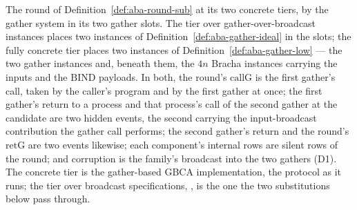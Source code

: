 \begin{definition}
  \label{def:aba-gbca-gather-low}
  \leanok
  The round of Definition~\ref{def:aba-round-sub} at its two concrete tiers, by the gather system in its two gather slots.
  The tier over gather-over-broadcast instances places two instances of Definition~\ref{def:aba-gather-ideal} in the slots; the fully concrete tier places two instances of Definition~\ref{def:aba-gather-low} --- the two gather instances and, beneath them, the $4n$ Bracha instances carrying the inputs and the $\mathrm{BIND}$ payloads.
  In both, the round's $\mathrm{callG}$ is the first gather's call, taken by the caller's program and by the first gather at once; the first gather's return to a process and that process's call of the second gather at the candidate are two hidden events, the second carrying the input-broadcast contribution the gather call performs; the second gather's return and the round's $\mathrm{retG}$ are two events likewise; each component's internal rows are silent rows of the round; and corruption is the family's broadcast into the two gathers (D1).
  The concrete tier  is the gather-based GBCA implementation, the protocol as it runs; the tier over broadcast specifications, , is the one the two substitutions below pass through.
\end{definition}
